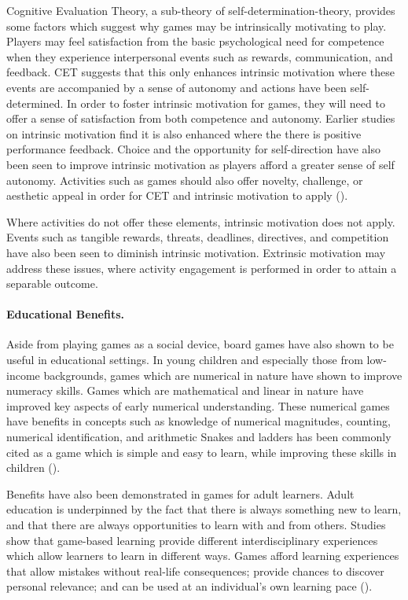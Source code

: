 \documentclass[12pt]{article}
\begin{document}
Cognitive Evaluation Theory, a sub-theory of self-determination-theory, provides some factors which suggest why games may be intrinsically motivating to play.
Players may feel satisfaction from the basic psychological need for competence when they experience interpersonal events such as rewards, communication, and feedback.
CET suggests that this only enhances intrinsic motivation where these events are accompanied by a sense of autonomy and actions have been self-determined. 
In order to foster intrinsic motivation for games, they will need to offer a sense of satisfaction from both competence and autonomy. Earlier studies on intrinsic motivation find it is also enhanced where the there is positive performance feedback. 
Choice and the opportunity for self-direction have also been seen to improve intrinsic motivation as players afford a greater sense of self autonomy. 
Activities such as games should also offer novelty, challenge, or aesthetic appeal in order for CET and intrinsic motivation to apply (\cite{ryan2000intrinsic}).

Where activities do not offer these elements, intrinsic motivation does not apply. 
Events such as tangible rewards, threats, deadlines, directives, and competition have also been seen to diminish intrinsic motivation. 
Extrinsic motivation may address these issues, where activity engagement is performed in order to attain a separable outcome. 

\paragraph{Educational Benefits.} Aside from playing games as a social device, board games have also shown to be useful in educational settings. 
In young children and especially those from low-income backgrounds, games which are numerical in nature have shown to improve numeracy skills. 
Games which are mathematical and linear in nature have improved key aspects of early numerical understanding. 
These numerical games have benefits in concepts such as knowledge of numerical magnitudes, counting, numerical identification, and arithmetic
Snakes and ladders has been commonly cited as a game which is simple and easy to learn, while improving these skills in children (\cite{siegler2009playing}).

Benefits have also been demonstrated in games for adult learners. 
Adult education is underpinned by the fact that there is always something new to learn, and that there are always opportunities to learn with and from others. 
Studies show that game-based learning provide different interdisciplinary experiences which allow learners to learn in different ways. Games afford learning experiences that allow mistakes without real-life consequences; provide chances to discover personal relevance; and can be used at an individual's own learning pace (\cite{boghian2019game}).
\end{document}
